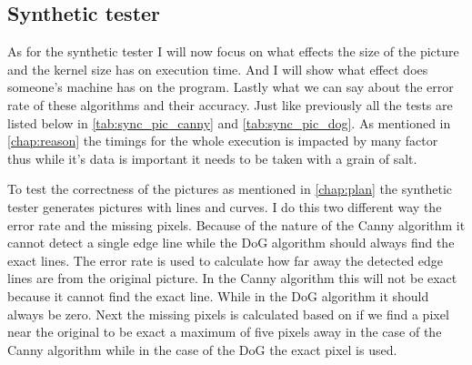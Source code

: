 \subsection{Synthetic tester}
\label{chap:test_synt_test}

As for the synthetic tester I will now focus on what effects the size of the picture and the kernel size has on execution time. And I will show what effect does someone's machine has on the program. Lastly what we can say about the error rate of these algorithms and their accuracy. Just like previously all the tests are listed below in \autoref{tab:sync_pic_canny} and \autoref{tab:sync_pic_dog}. As mentioned in \autoref{chap:reason} the timings for the whole execution is impacted by many factor thus while it's data is important it needs to be taken with a grain of salt.

To test the correctness of the pictures as mentioned in \autoref{chap:plan} the synthetic tester generates pictures with lines and curves. I do this two different way the error rate and the missing pixels. Because of the nature of the \ac{Canny} algorithm it cannot detect a single edge line while the \ac{DoG} algorithm should always find the exact lines. The error rate is used to calculate how far away the detected edge lines are from the original picture. In the \ac{Canny} algorithm this will not be exact because it cannot find the exact line. While in the \ac{DoG} algorithm it should always be zero. Next the missing pixels is calculated based on if we find a pixel near the original to be exact a maximum of five pixels away in the case of the \ac{Canny} algorithm while in the case of the \ac{DoG} the exact pixel is used.

\begin{table}[H]
\centering
{}
\caption{Test plans for the  Synthetic tester for \ac{Canny} algorithm}
\label{tab:sync_pic_canny}
\end{table}

